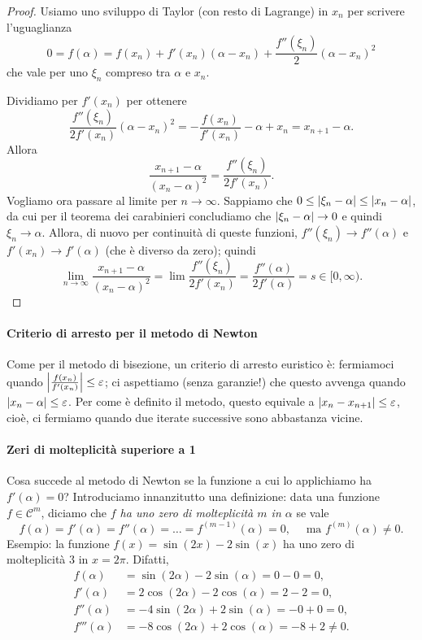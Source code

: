 \documentclass[a4paper]{report}
\DeclarePairedDelimiter{\abs}{\lvert}{\rvert}
\theoremstyle{definiton}
\theoremstyle{remark}
\begin{document}
\begin{proof}
Usiamo uno sviluppo di Taylor (con resto di Lagrange) in $x_n$ per scrivere l'uguaglianza
\[
0 = f(\alpha) = f(x_n) + f'(x_n)(\alpha-x_n) + \frac{f''(\xi_n)}{2}(\alpha-x_n)^2
\]
che vale per uno $\xi_n$ compreso tra $\alpha$ e $x_n$.

Dividiamo per $f'(x_n)$ per ottenere
\[
\frac{f''(\xi_n)}{2f'(x_n)}(\alpha-x_n)^2 = - \frac{f(x_n)}{f'(x_n)} - \alpha + x_n   =  x_{n+1} - \alpha.
\]
Allora
\[
\frac{x_{n+1} - \alpha}{(x_n-\alpha)^2} = \frac{f''(\xi_n)}{2f'(x_n)}.
\]
Vogliamo ora passare al limite per $n \to \infty$. Sappiamo che $0 \leq \abs{\xi_n - \alpha} \leq \abs{x_n - \alpha}$, da cui per il teorema dei carabinieri concludiamo che $\abs{\xi_n - \alpha} \to 0$ e quindi $\xi_n \to \alpha$. Allora, di nuovo per continuità di queste funzioni, $f''(\xi_n) \to f''(\alpha)$ e $f'(x_n) \to f'(\alpha)$ (che è diverso da zero); quindi
\[
\lim_{n\to\infty} \frac{x_{n+1} - \alpha}{(x_n-\alpha)^2} = \lim \frac{f''(\xi_n)}{2f'(x_n)} = \frac{f''(\alpha)}{2f'(\alpha)} = s \in [0,\infty).
\]
\end{proof}

\paragraph{Criterio di arresto per il metodo di Newton} Come per il metodo di bisezione, un criterio di arresto euristico è: fermiamoci quando $\abs*{\frac{f(x_n)}{f'(x_n)}} \leq \varepsilon$; ci aspettiamo (senza garanzie!) che questo avvenga quando $\abs{x_n - \alpha} \leq \varepsilon$. Per come è definito il metodo, questo equivale a $\abs{x_n - x_{n+1}} \leq \varepsilon$, cioè, ci fermiamo quando due iterate successive sono abbastanza vicine.

\paragraph{Zeri di molteplicità superiore a 1} Cosa succede al metodo di Newton se la funzione a cui lo applichiamo ha $f'(\alpha) = 0$? Introduciamo innanzitutto una definizione: data una funzione $f\in\mathcal{C}^m$, diciamo che \emph{$f$ ha uno zero di molteplicità $m$ in $\alpha$} se vale
\[
f(\alpha) = f'(\alpha) = f''(\alpha) = \dots = f^{(m-1)}(\alpha) = 0, \quad \text{ ma } f^{(m)}(\alpha) \neq 0.
\]
Esempio: la funzione $f(x) = \sin(2x) - 2\sin(x)$ ha uno zero di molteplicità $3$ in $x=2\pi$. Difatti,
\begin{align*}
    f(\alpha) &= \sin(2\alpha) - 2\sin(\alpha) = 0 - 0 = 0,\\
    f'(\alpha) &= 2\cos(2\alpha) - 2\cos(\alpha) = 2 - 2 = 0,\\
    f''(\alpha) &= -4\sin(2\alpha) +2\sin(\alpha) = -0 + 0 = 0,\\
    f'''(\alpha) &= -8\cos(2\alpha) +2\cos(\alpha) = -8 + 2 \neq 0.
\end{align*}
\end{document}
